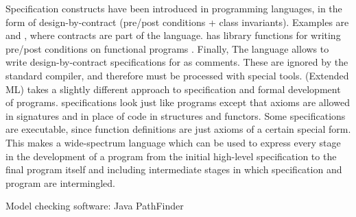 Specification constructs have been introduced in programming languages, in the form
of design-by-contract (pre/post conditions + class invariants). Examples are
\eiffel{} \cite{eiffel} and \specsharp{} \cite{specsharp}, where contracts are 
part of the language. \scala{} has library functions for writing pre/post conditions 
on functional programs \cite{odersky-rv10}. Finally, The \jml{} language \cite{jml} 
allows to write design-by-contract specifications for \java{} as comments. These are 
ignored by the standard \java{} compiler, and therefore must be processed with 
special tools. \eml{} (Extended ML) \cite{sannella-eml-97} takes a slightly different 
approach to specification and formal development of \sml{} programs.
\eml{} specifications look just like \sml{} programs except that axioms are allowed in 
signatures and in place of code in structures and functors. Some \eml{} specifications 
are executable, since \sml{} function definitions are just axioms of a certain special 
form. This makes \eml{} a wide-spectrum language which can be used to express every 
stage in the development of a \sml{} program from the initial high-level specification 
to the final program itself and including intermediate stages in which specification and program are intermingled.

Model checking software:
  Java PathFinder 
    \cite{havelund-jpf-00}
    \cite{havelund-visser02}  
  \cite{holzmann-spin-2004}


